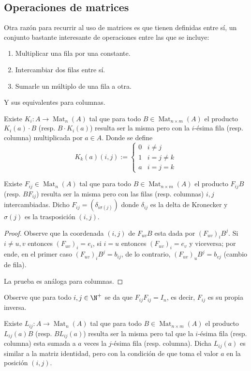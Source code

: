 \documentclass[11pt,oneside]{book}
\DeclareMathOperator{\Mat}{Mat}
\begin{document}
\subsection*{Operaciones de matrices}
Otra razón para recurrir al uso de matrices es que tienen definidas entre sí, un conjunto bastante interesante de operaciones entre las que se incluye:
\begin{enumerate}
	\item Multiplicar una fila por una constante.
	\item Intercambiar dos filas entre sí.
	\item Sumarle un múltiplo de una fila a otra.
\end{enumerate}
Y sus equivalentes para columnas.
\begin{thm}
Existe $K_i:A\rightarrow\Mat_n(A)$ tal que para todo $B\in\Mat_{n\times m}(A)$ el producto $K_i(a)\cdot B$ (resp. $B\cdot K_i(a)$) resulta ser la misma pero con la $i$-ésima fila (resp. columna) multiplicada por $a\in A$. Donde se define
$$K_k(a)(i,j):=\begin{cases}
0 &i\neq j\\
1 &i=j\neq k\\
a &i=j=k
\end{cases}$$
\end{thm}
\begin{thm}
Existe $F_{ij}\in\Mat_n(A)$ tal que para todo $B\in\Mat_{n\times m}(A)$ el producto $F_{ij} B$ (resp. $BF_{ij}$) resulta ser la misma pero con las filas (resp. columnas) $i,j$ intercambiadas. Dicho $F_{ij}=(\delta_{i\sigma(j)})$ donde $\delta_{ij}$ es la delta de Kronecker y $\sigma(j)$ es la trasposición $(i,j)$.
\end{thm}
\begin{proof}
Observe que la coordenada $(i,j)$ de $F_{uv}B$ esta dada por $(F_{uv})_iB^j$. Si $i\neq u,v$ entonces $(F_{uv})_i=e_i$, si $i=u$ entonces $(F_{uv})_i=e_v$ y viceversa; por ende, en el primer caso $(F_{uv})_iB^j=b_{ij}$, de lo contrario, $(F_{uv})_uB^j=b_{vj}$ (cambio de fila).

La prueba es análoga para columnas.
\end{proof}
Observe que para todo $i,j\in\N^+$ se da que $F_{ij}F_{ij}=I_n$, es decir, $F_{ij}$ es su propia inversa.
\begin{thm}
Existe $L_{ij}:A\rightarrow\Mat_n(A)$ tal que para todo $B\in\Mat_{n\times m}(A)$ el producto $L_{ij}(a)B$ (resp. $BL_{ij}(a)$) resulta ser la misma pero tal que la $i$-ésima fila (resp. columna) esta sumada a $a$ veces la $j$-ésima fila (resp. columna). Dicha $L_{ij}(a)$ es similar a la matriz identidad, pero con la condición de que toma el valor $a$ en la posición $(i,j)$.
\end{thm}
\end{document}
